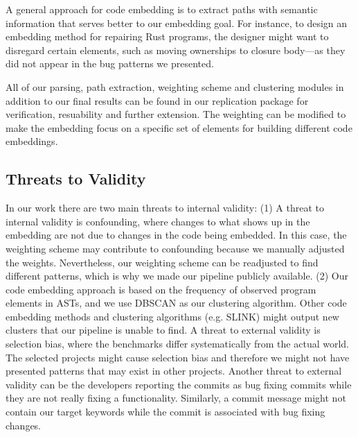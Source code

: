 A general approach for code embedding is to extract paths with semantic information that serves better to our embedding goal. For instance, to design an embedding method for repairing Rust programs, the designer might want to disregard certain elements, such as moving ownerships to closure body---as they did not appear in the bug patterns we presented.

All of our parsing, path extraction, weighting scheme and clustering modules in addition to our final results can be found in our replication package for verification, resuability and further extension. The weighting can be modified to make the embedding focus on a specific set of elements for building different code embeddings.

\subsection{Threats to Validity}

In our work there are two main threats to internal validity: (1) A threat to internal validity is confounding, where changes to what shows up in the embedding are not due to changes in the code being embedded. In this case, the weighting scheme may contribute to confounding because we manually adjusted the weights. Nevertheless, our weighting scheme can be readjusted to find different patterns, which is why we made our pipeline publicly available. (2) Our code embedding approach is based on the frequency of observed program elements in ASTs, and we use DBSCAN as our clustering algorithm. Other code embedding methods and clustering algorithms (e.g. SLINK) might output new clusters that our pipeline is unable to find. A threat to external validity is selection bias, where the benchmarks differ systematically from the actual world. The selected projects might cause selection bias and therefore we might not have presented patterns that may exist in other projects. Another threat to external validity can be the developers reporting the commits as bug fixing commits while they are not really fixing a functionality. Similarly, a commit message might not contain our target keywords while the commit is associated with bug fixing changes.
